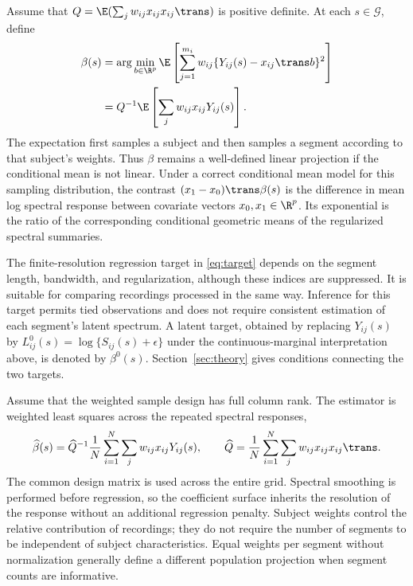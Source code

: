 Assume that $Q=\E(\sum_jw_{ij}x_{ij}x_{ij}\trans)$ is positive definite. At each $s\in\mathcal G$, define
\begin{equation}\label{eq:target}
 \begin{split}
 \beta(s)&=\arg\min_{b\in\R^p}
 \E\left[\sum_{j=1}^{m_i}w_{ij}\{Y_{ij}(s)-x_{ij}\trans b\}^2\right]\\
 &=Q^{-1}\E\left[\sum_jw_{ij}x_{ij}Y_{ij}(s)\right].
 \end{split}
\end{equation}
The expectation first samples a subject and then samples a segment according to that subject's weights. Thus $\beta$ remains a well-defined linear projection if the conditional mean is not linear. Under a correct conditional mean model for this sampling distribution, the contrast $(x_1-x_0)\trans\beta(s)$ is the difference in mean log spectral response between covariate vectors $x_0,x_1\in\R^p$. Its exponential is the ratio of the corresponding conditional geometric means of the regularized spectral summaries.

The finite-resolution regression target in \eqref{eq:target} depends on the segment length, bandwidth, and regularization, although these indices are suppressed. It is suitable for comparing recordings processed in the same way. Inference for this target permits tied observations and does not require consistent estimation of each segment's latent spectrum. A latent target, obtained by replacing $Y_{ij}(s)$ by $L^0_{ij}(s)=\log\{S_{ij}(s)+\epsilon\}$ under the continuous-marginal interpretation above, is denoted by $\beta^0(s)$. Section~\ref{sec:theory} gives conditions connecting the two targets.

Assume that the weighted sample design has full column rank. The estimator is weighted least squares across the repeated spectral responses,
\begin{equation}\label{eq:estimator}
 \widehat\beta(s)=\widehat Q^{-1}\frac1N
 \sum_{i=1}^N\sum_jw_{ij}x_{ij}Y_{ij}(s),
 \qquad
 \widehat Q=\frac1N\sum_{i=1}^N\sum_jw_{ij}x_{ij}x_{ij}\trans.
\end{equation}
The common design matrix is used across the entire grid. Spectral smoothing is performed before regression, so the coefficient surface inherits the resolution of the response without an additional regression penalty. Subject weights control the relative contribution of recordings; they do not require the number of segments to be independent of subject characteristics. Equal weights per segment without normalization generally define a different population projection when segment counts are informative.

